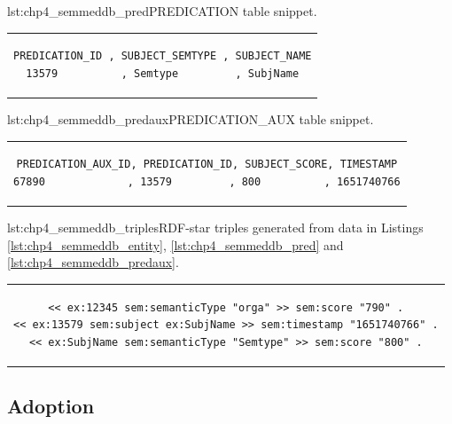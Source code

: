 \begin{minipage}{\linewidth}
\begin{captionedlisting}{lst:chp4_semmeddb_pred}{PREDICATION table snippet.}
\centering
\begin{tabular}{c}
{
\begin{lstlisting}[basicstyle=\ttfamily\small,label={list:example1},columns=flexible]
PREDICATION_ID , SUBJECT_SEMTYPE , SUBJECT_NAME
13579          , Semtype         , SubjName
\end{lstlisting}
}
\end{tabular}
\end{captionedlisting}
\end{minipage}

\begin{minipage}{\linewidth}
\begin{captionedlisting}{lst:chp4_semmeddb_predaux}{PREDICATION\_AUX table snippet.}
\centering
\begin{tabular}{c}
{
\begin{lstlisting}[basicstyle=\ttfamily\small,label={list:example1},columns=flexible]
PREDICATION_AUX_ID, PREDICATION_ID, SUBJECT_SCORE, TIMESTAMP
67890             , 13579         , 800          , 1651740766
\end{lstlisting}
}
\end{tabular}
\end{captionedlisting}
\end{minipage}

\begin{minipage}{\linewidth}
\begin{captionedlisting}{lst:chp4_semmeddb_triples}{RDF-star triples generated from data in Listings \ref{lst:chp4_semmeddb_entity}, \ref{lst:chp4_semmeddb_pred} and \ref{lst:chp4_semmeddb_predaux}.}
\centering
\begin{tabular}{c}
{
\begin{lstlisting}[basicstyle=\ttfamily\small,label={list:example1},columns=flexible]
<< ex:12345 sem:semanticType "orga" >> sem:score "790" .
<< ex:13579 sem:subject ex:SubjName >> sem:timestamp "1651740766" .
<< ex:SubjName sem:semanticType "Semtype" >> sem:score "800" .
\end{lstlisting}
}
\end{tabular}
\end{captionedlisting}
\end{minipage}



\subsection{Adoption}


